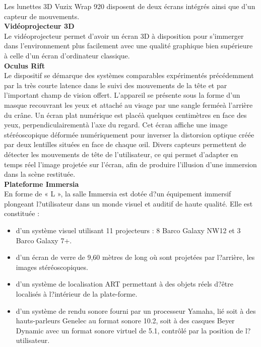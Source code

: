 Les lunettes 3D Vuzix Wrap 920 disposent de deux \'ecrans int\'egr\'es ainsi que d'un capteur de mouvements.
\\

\textbf{Vid\'eoprojecteur 3D}
\\

Le vid\'eoprojecteur permet d'avoir un \'ecran 3D \`a disposition pour s'immerger dans l'environnement plus facilement avec une qualit\'e graphique bien sup\'erieure \`a celle d'un \'ecran d'ordinateur classique.
\\


\textbf{Oculus Rift}
\\

Le dispositif se d\'emarque des syst\`emes comparables exp\'eriment\'es pr\'ec\'edemment par la tr\`es courte latence dans le suivi des mouvements de la t\^ete et par l'important champ de vision offert. L'appareil se pr\'esente sous la forme d'un masque recouvrant les yeux et attach\'e au visage par une sangle ferm\'ee\`a l'arri\`ere du cr\^ane. Un \'ecran plat num\'erique est plac\'e\`a quelques centim\`etres en face des yeux, perpendiculairement\`a l'axe du regard. Cet \'ecran affiche une image st\'er\'eoscopique d\'eform\'ee num\'eriquement pour inverser la distorsion optique cr\'e\'ee par deux lentilles situ\'ees en face de chaque œil. Divers capteurs permettent de d\'etecter les mouvements de t\^ete de l'utilisateur, ce qui permet d'adapter en temps r\'eel l'image projet\'ee sur l'\'ecran, afin de produire l'illusion d'une immersion dans la sc\`ene restitu\'ee.
\\

\textbf{Plateforme Immersia}
\\

En forme de « L », la salle Immersia est dot\'ee d?un \'equipement immersif plongeant l?utilisateur dans un monde visuel et auditif de haute qualit\'e. 
Elle est constitu\'ee  :
\begin{itemize}
  \item d'un syst\`eme visuel utilisant 11 projecteurs : 8 Barco Galaxy NW12 et 3 Barco Galaxy 7+.
  \item d'un \'ecran de verre de 9,60 m\`etres de long o\`u sont projet\'ees par l?arri\`ere, les images st\'er\'eoscopiques.
  \item d'un syst\`eme de localisation ART permettant \`a des objets r\'eels d?\^etre localis\'es \`a l?int\'erieur de la plate-forme.
  \item d'un syst\`eme de rendu sonore fourni par un processeur Yamaha, li\'e soit \`a des hauts-parleurs Genelec au format sonore 10.2, soit \`a des casques Beyer Dynamic avec un format sonore virtuel de 5.1, contrôl\'e par la position de l?utilisateur.
\end{itemize}

